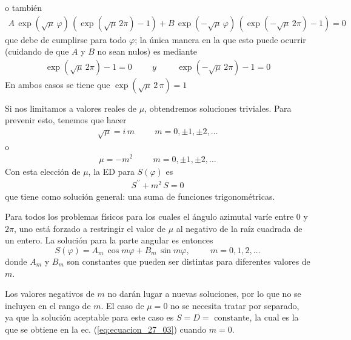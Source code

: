 o también
\begin{align*}
A \, \exp(\sqrt{\mu} \, \varphi) \, (\exp(\sqrt{\mu} \, 2 \pi) - 1) + B \, \exp(- \sqrt{\mu} \, \varphi) \, (\exp(- \sqrt{\mu} \, 2 \pi) - 1) = 0
\end{align*}
que debe de cumplirse para todo $\varphi$; la única manera en la que esto puede ocurrir (cuidando de que $A$ y $B$ no sean nulos) es mediante
\begin{align*}
\exp(\sqrt{\mu} \, 2 \pi) - 1 = 0 \hspace{1cm} y \hspace{1cm} \exp(- \sqrt{\mu} \, 2 \pi) - 1 = 0
\end{align*}
En ambos casos se tiene que $\exp(\sqrt{\mu} \, 2 \, \pi) = 1$
\par
Si nos limitamos a valores reales de $\mu$, obtendremos soluciones triviales. Para prevenir esto, tenemos que hacer
\begin{align*}
\sqrt{\mu} = i \, m \hspace{1cm} m = 0, \pm 1, \pm 2, \ldots
\end{align*}
o
\begin{align*}
\mu = -m^{2}  \hspace{1cm} m = 0, \pm 1, \pm 2, \ldots
\end{align*}
Con esta elección de $\mu$, la ED para $S(\varphi)$ es
\begin{align*}
S^{\prime \prime} + m^{2} \, S = 0
\end{align*}
que tiene como solución general: una suma de funciones trigonométricas.
\begin{teo}
Para todos los problemas físicos para los cuales el ángulo azimutal varíe entre $0$ y $2 \pi$, uno está forzado a restringir el valor de $\mu$ al negativo de la raíz cuadrada de un entero. La solución para la parte angular es entonces
\begin{equation}
S (\varphi) = A_{m} \, \cos m \varphi + B_{m} \, \sin m \varphi, \hspace{1cm} m = 0, 1, 2, \ldots
\label{eq:ecuacion_27_03}
\end{equation}
donde $A_{m}$ y $B_{m}$ son constantes que pueden ser distintas para diferentes valores de $m$.
\end{teo}
Los valores negativos de $m$ no darán lugar a nuevas soluciones, por lo que no se incluyen en el rango de $m$. El caso de $\mu = 0$ no se necesita tratar por separado, ya que la solución aceptable para este caso es $S = D = \mbox{ constante}$, la cual es la que se obtiene en la ec. (\ref{eq:ecuacion_27_03}) cuando $m = 0$.
